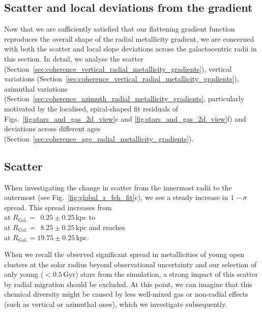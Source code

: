 \documentclass[twocolumn,apj,numberedappendix,appendixfloats,twocolappendix]{openjournal}
\newcommand{\nihaoAGEmax}{$0.5\,\mathrm{Gyr}$}
\begin{document}
\begin{CJK*}{UTF8}{gbsn}
\section{Scatter and local deviations from the gradient}
\label{sec:scatter_radial_metallicity_gradients}

Now that we are sufficiently satisfied that our flattening gradient function reproduces the overall shape of the radial metallicity gradient, we are concerned with both the scatter and local slope deviations across the galactocentric radii in this section. In detail, we analyse the scatter (Section~\ref{sec:coherence_vertical_radial_metallicity_gradients}), vertical variations (Section~\ref{sec:coherence_vertical_radial_metallicity_gradients}), azimuthal variations (Section~\ref{sec:coherence_azimuth_radial_metallicity_gradients}, particularly motivated by the localised, spiral-shaped fit residuals of Figs.~\ref{fig:stars_and_gas_2d_view}c and \ref{fig:stars_and_gas_2d_view}f) and deviations across different ages (Section~\ref{sec:coherence_age_radial_metallicity_gradients}).

\subsection{Scatter}
\label{sec:scatter}

When investigating the change in scatter from the innermost radii to the outermost (see Fig.~\ref{fig:global_r_feh_fit}c), we see a steady increase in $1-\sigma$ spread. This spread increases from \\
 at $R_\mathrm{Gal.} = ~~0.25 \pm 0.25\,\mathrm{kpc}$ to \\
 at $R_\mathrm{Gal.} = ~~8.25 \pm 0.25\,\mathrm{kpc}$ and reaches \\
 at $R_\mathrm{Gal.} = 19.75 \pm 0.25\,\mathrm{kpc}$.

When we recall the observed significant spread in metallicities of young open clusters at the solar radius beyond observational uncertainty \citep[e.g.][]{Donor2020, Spina2021} and our selection of only young ($<$\nihaoAGEmax) stars from the simulation, a strong impact of this scatter by radial migration should be excluded. At this point, we can imagine that this chemical diversity might be caused by less well-mixed gas or non-radial effects (such as vertical or azimuthal ones), which we investigate subsequently.


\end{CJK*}
\end{document}
